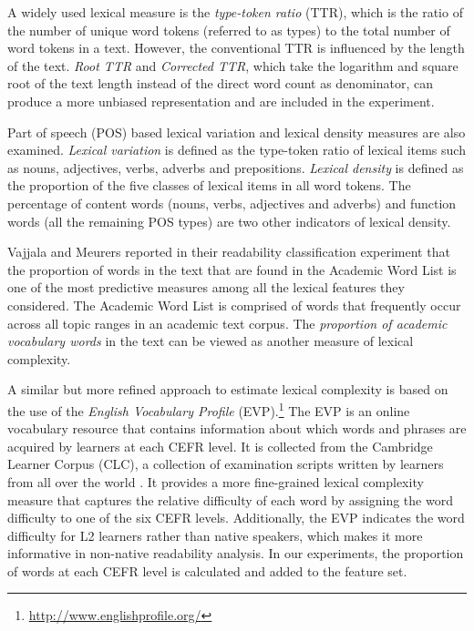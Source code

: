 \documentclass[11pt,letterpaper]{article}
\begin{document}
A widely used lexical measure is the \textit{type-token ratio} (TTR), which is the ratio of the number of unique word tokens (referred to as types) to the total number of word tokens in a text. However, the conventional TTR is influenced by the length of the text. \textit{Root TTR} and \textit{Corrected TTR}, which take the logarithm and square root of the text length instead of the direct word count as denominator, can produce a more unbiased representation and are included in the experiment.

Part of speech (POS) based lexical variation and lexical density measures \cite{lu2011carpus} are also examined. \textit{Lexical variation} is defined as the type-token ratio of lexical items such as nouns, adjectives, verbs, adverbs and prepositions. \textit{Lexical density} is defined as the proportion of the five classes of lexical items in all word tokens. The percentage of content words (nouns, verbs, adjectives and adverbs) and function words (all the remaining POS types) are two other indicators of lexical density. 
				
Vajjala and Meurers  reported in their readability classification experiment that the proportion of words in the text that are found in the Academic Word List is one of the most predictive measures among all the lexical features they considered. The Academic Word List \cite{coxhead2000new} is comprised of words that frequently occur across all topic ranges in an academic text corpus. The {\em proportion of academic vocabulary words} in the text can be viewed as another measure of lexical complexity.
				
A similar but more refined approach to estimate lexical complexity is based on the use of the {\em English Vocabulary Profile} (EVP).\footnote{\url{http://www.englishprofile.org/}} The EVP is an online vocabulary resource that contains information about which words and phrases are acquired by learners at each CEFR level. It is collected from the Cambridge Learner Corpus (CLC), a collection of examination scripts written by learners from all over the world \cite{capel2012completing}. It provides a more fine-grained lexical complexity measure that captures the relative difficulty of each word by assigning the word difficulty to one of the six CEFR levels. Additionally, the EVP indicates the word difficulty for L2 learners rather than native speakers, which makes it more informative in non-native readability analysis. In our experiments, the proportion of words at each CEFR level is calculated and added to the feature set. 
\end{document}

